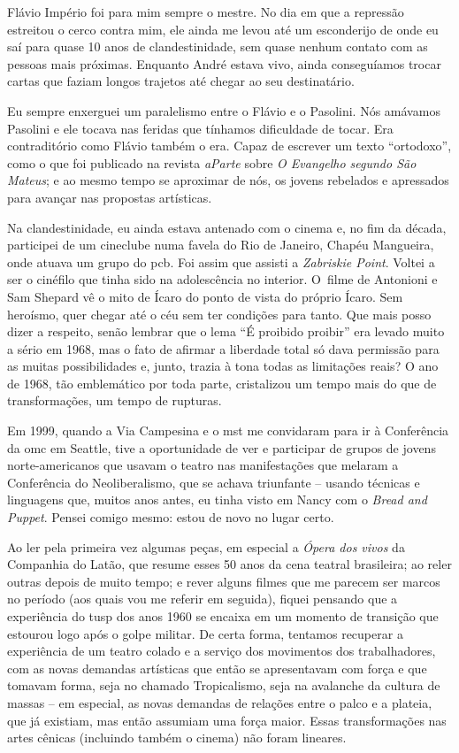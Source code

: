 Flávio Império foi para mim sempre o mestre. No dia em que a repressão
estreitou o cerco contra mim, ele ainda me levou até um esconderijo de
onde eu saí para quase 10 anos de clandestinidade, sem quase nenhum
contato com as pessoas mais próximas. Enquanto André estava vivo, ainda
conseguíamos trocar cartas que faziam longos trajetos até chegar ao seu destinatário.

Eu sempre enxerguei um paralelismo entre o Flávio e o Pasolini. Nós
amávamos Pasolini e ele tocava nas feridas que tínhamos dificuldade de
tocar. Era contraditório como Flávio também o era. Capaz de escrever um
texto “ortodoxo”, como o que foi publicado na revista {\it aParte} sobre
{\it O Evangelho segundo São Mateus}; e ao mesmo tempo se aproximar de
nós, os jovens rebelados e apressados para avançar nas propostas
artísticas.

Na clandestinidade, eu ainda estava antenado com o cinema e, no fim da
década, participei de um cineclube numa favela do Rio de Janeiro,
Chapéu Mangueira, onde atuava um grupo do {\sc pcb}. Foi assim que
assisti a {\it Zabriskie Point}. Voltei a ser o cinéfilo que tinha sido na
adolescência no interior. O~filme de Antonioni e Sam Shepard vê o mito
de Ícaro do ponto de vista do próprio Ícaro. Sem heroísmo, quer chegar
até o céu sem ter condições para tanto. Que mais posso dizer a respeito,
senão lembrar que o lema “É proibido proibir” era levado muito a sério
em 1968, mas o fato de afirmar a liberdade total só dava permissão para as
muitas possibilidades e, junto, trazia à tona todas as limitações reais?
O ano de 1968, tão emblemático por toda parte, cristalizou um tempo mais do que de
transformações, um tempo de rupturas.

Em 1999, quando a Via Campesina e o {\sc mst} me convidaram para ir
à Conferência da {\sc omc} em Seattle, tive a oportunidade de ver e participar
de grupos de jovens norte-americanos que usavam o teatro nas manifestações que
melaram a Conferência do Neoliberalismo, que se achava triunfante --
usando técnicas e linguagens que, muitos anos antes, eu tinha visto em
Nancy com o {\it Bread and Puppet}. Pensei comigo mesmo: estou de
novo no lugar certo.

\subject{***}

Ao ler pela primeira vez algumas peças, em especial a {\it Ópera dos
vivos} da Companhia do Latão, que resume esses 50 anos da cena teatral
brasileira; ao reler outras depois de muito tempo; e rever
alguns filmes que me parecem ser marcos no período (aos quais vou me
referir em seguida), fiquei pensando que a experiência do {\sc tusp} dos anos
1960 se encaixa em um momento de transição que estourou logo após o golpe
militar. De certa forma, tentamos recuperar a experiência de um teatro
colado e a serviço dos movimentos dos trabalhadores, com as novas
demandas artísticas que então se apresentavam com força e que tomavam
forma, seja no chamado Tropicalismo, seja na avalanche da cultura de
massas -- em especial, as novas demandas de relações entre o palco e a
plateia, que já existiam, mas então assumiam uma força maior. Essas transformações
nas artes cênicas (incluindo também o cinema) não foram lineares.

